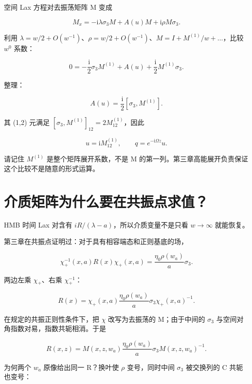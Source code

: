 空间 Lax 方程对去振荡矩阵 M 变成\par

\[
M_x=-\mathrm{i}\lambda\sigma_3M+A(u)M
+\mathrm{i}\rho M\sigma_3.
\]

利用 $\lambda{}=w/2+O(w^{-1})$、$\rho{}=w/2+O(w^{-1})$、$M=I+M^{(1)}/w+…$，比较 $w^{0}$ 系数：\par

\[
0=-\dfrac{\mathrm{i}}{2}\sigma_3 M^{(1)}
+A(u)+\dfrac{\mathrm{i}}{2}M^{(1)}\sigma_3.
\]

整理：\par

\[
A(u)=\dfrac{\mathrm{i}}{2}
[\sigma_3,M^{(1)}].
\]

其 (1,2) 元满足 $[\sigma{}_{3},M^{(1)}]_{12}=2M^{(1)}_{12}$，因此\par

\[
\boxed{u=\mathrm{i}M^{(1)}_{12}},
\qquad q=e^{-\mathrm{i}\Omega z}u.
\]

请记住 $M^{(1)}$ 是整个矩阵展开系数，不是 M 的第一列。第三章高能展开负责保证这个比较不是随意的形式运算。\par

\section{介质矩阵为什么要在共振点求值？}
\par

HMB 时间 Lax 对含有 $iR/(\lambda{}-a)$，所以介质变量不是只看 $w\to{}\infty{}$ 就能恢复。\par

第三章在共振点证明过：对于具有相容端态和正则基底的场，\par

\[
\chi_+^{-1}(x,a)R(x)\chi_+(x,a)
=\dfrac{\eta_0\rho(w_a)}{a}\sigma_3.
\]

两边左乘 $\chi{}_{+}$、右乘 $\chi{}_{+}^{-1}$：\par

\[
R(x)=\chi_+(x,a)
\dfrac{\eta_0\rho(w_a)}{a}\sigma_3
\chi_+(x,a)^{-1}.
\]

在规定的共振正则性条件下，把 $\chi{}$ 改写为去振荡的 M；由于中间的 $\sigma{}_{3}$ 与空间对角指数对易，指数共轭相消。于是\par

\[
\boxed{
R(x,z)=M(x,z,w_a)
\dfrac{\eta_0\rho(w_a)}{a}\sigma_3
M(x,z,w_a)^{-1}.
}
\]

为何两个 $w_{a}$ 原像给出同一 R？换叶使 $\rho{}$ 变号，同时中间 $\sigma{}_{3}$ 被交换列的 C 共轭也变号：\par

